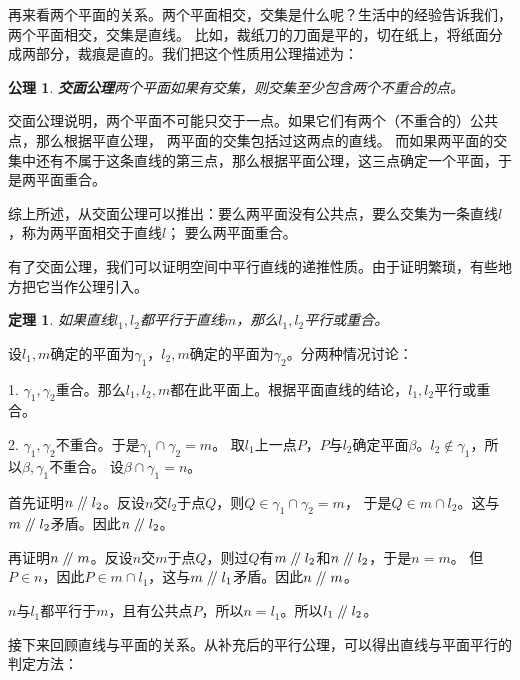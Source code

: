 \documentclass[12pt,UTF8]{ctexbook}
\newtheorem{tm}{定理}[section]
\newtheorem{po}{公理}
\renewcommand\parallel{\mathrel{/\mskip-4mu/}}
\begin{document}
再来看两个平面的关系。两个平面相交，交集是什么呢？生活中的经验告诉我们，两个平面相交，交集是直线。
比如，裁纸刀的刀面是平的，切在纸上，将纸面分成两部分，裁痕是直的。我们把这个性质用公理描述为：
\begin{po}{\textbf{交面公理}}\label{po:3}
    两个平面如果有交集，则交集至少包含两个不重合的点。
\end{po}
交面公理说明，两个平面不可能只交于一点。如果它们有两个（不重合的）公共点，那么根据平直公理，
两平面的交集包括过这两点的直线。
而如果两平面的交集中还有不属于这条直线的第三点，那么根据平面公理，这三点确定一个平面，于是两平面重合。

综上所述，从交面公理可以推出：要么两平面没有公共点，要么交集为一条直线$l$，称为两平面相交于直线$l$；
要么两平面重合。

有了交面公理，我们可以证明空间中平行直线的递推性质。由于证明繁琐，有些地方把它当作公理引入。
\begin{tm}\label{tm:1-0-10}
    如果直线$l_1,l_2$都平行于直线$m$，那么$l_1,l_2$平行或重合。
\end{tm}
\begin{proof2}
    设$l_1,m$确定的平面为$\gamma_1$，$l_2,m$确定的平面为$\gamma_2$。分两种情况讨论：
    

    1. $\gamma_1, \gamma_2$重合。那么$l_1,l_2,m$都在此平面上。根据平面直线的结论，$l_1,l_2$平行或重合。
    
    2. $\gamma_1, \gamma_2$不重合。于是$\gamma_1\cap \gamma_2 = m$。
    取$l_1$上一点$P$，$P$与$l_2$确定平面$\beta$。$l_2\notin\gamma_1$，所以$\beta,\gamma_1$不重合。
    设$\beta\cap\gamma_1 = n$。
    
    首先证明$n\parallel l_2$。反设$n$交$l_2$于点$Q$，则$Q\in\gamma_1\cap\gamma_2=m$，
    于是$Q\in m\cap l_2$。这与$m\parallel l_2$矛盾。因此$n\parallel l_2$。
    
    再证明$n\parallel m$。反设$n$交$m$于点$Q$，则过$Q$有$m\parallel l_2$和$n\parallel l_2$，于是$n=m$。
    但$P\in n$，因此$P\in m\cap l_1$，这与$m\parallel l_1$矛盾。因此$n\parallel m$。
    
    $n$与$l_1$都平行于$m$，且有公共点$P$，所以$n = l_1$。所以$l_1\parallel l_2$。
\end{proof2}

接下来回顾直线与平面的关系。从补充后的平行公理，可以得出直线与平面平行的判定方法：
\end{document}
